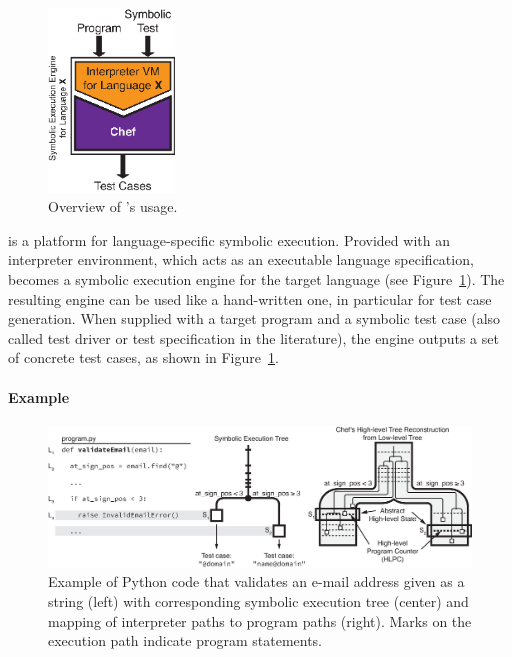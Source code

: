 \begin{figure}
  \centering
  \includegraphics[width=0.3\textwidth]{chef/figures/usage-model}
  \caption{Overview of \chef's usage.}
  \label{fig:chef:overview}
\end{figure}

\chef is a platform for language-specific symbolic execution.
%
Provided with an interpreter environment, which acts as an executable language specification, \chef becomes a symbolic execution engine for the target language (see Figure~\ref{fig:chef:overview}).
%
The resulting engine can be used like a hand-written one, in particular for test case generation.  When supplied with a target program and a symbolic test case (also called test driver or test specification in the literature), the \chef engine outputs a set of concrete test cases, as shown in Figure~\ref{fig:chef:overview}.

\paragraph{Example}

\begin{figure}
  \centering
  \includegraphics[width=\textwidth]{chef/figures/running-example}
  \caption[Example of Python code that validates an e-mail address given as a string with corresponding symbolic execution tree and mapping of interpreter paths to program paths.]{Example of Python code that validates an e-mail address given as a string (left) with corresponding symbolic execution tree (center) and mapping of interpreter paths to program paths (right).  Marks on the execution path indicate program statements.}
  \label{fig:chef:running-example}
\end{figure}


